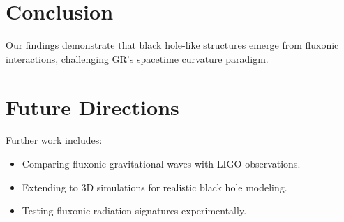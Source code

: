 \documentclass{article}
\begin{document}
\section{Conclusion}
Our findings demonstrate that black hole-like structures emerge from fluxonic interactions, challenging GR’s spacetime curvature paradigm.

\section{Future Directions}
Further work includes:
\begin{itemize}
    \item Comparing fluxonic gravitational waves with LIGO observations.
    \item Extending to 3D simulations for realistic black hole modeling.
    \item Testing fluxonic radiation signatures experimentally.
\end{itemize}
\end{document}
